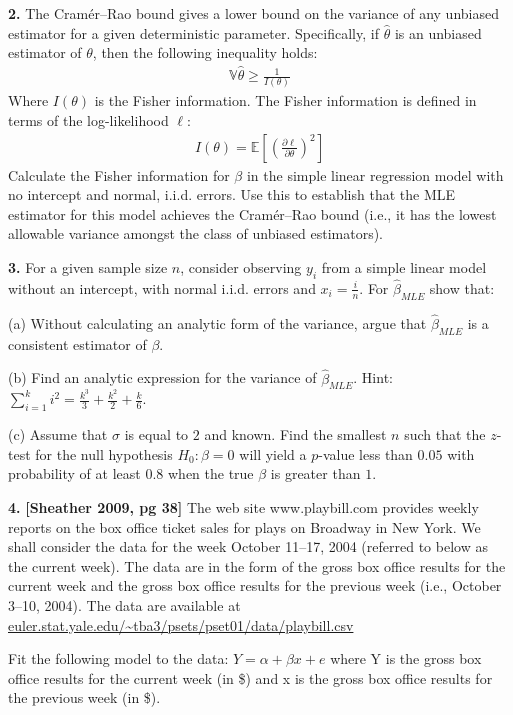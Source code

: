 \documentclass[12pt]{article}
\begin{document}
\bigskip

{\bf 2.} The Cramér–Rao bound gives a lower bound on the variance of any unbiased estimator
for a given deterministic parameter. Specifically, if $\widehat{\theta}$ is an unbiased
estimator of $\theta$, then the following inequality holds:
\begin{align}
\mathbb{V} \widehat{\theta} \geq \frac{1}{I(\theta)}
\end{align}
Where $I(\theta)$ is the Fisher information. The Fisher information is defined in terms
of the log-likelihood $\ell$:
\begin{align}
I(\theta) = \mathbb{E} \left[ \left( \frac{\partial \ell}{\partial \theta} \right)^2 \right]
\end{align}
Calculate the Fisher information for $\beta$ in the simple linear regression model with
no intercept and normal, i.i.d. errors. Use this to establish that the MLE estimator for
this model achieves the Cramér–Rao bound (i.e., it has the lowest allowable variance
amongst the class of unbiased estimators).

{\bf 3.} For a given sample size $n$, consider observing $y_i$ from a simple linear model
without an intercept, with normal i.i.d. errors and $x_i = \frac{i}{n}$.
For $\widehat{\beta}_{MLE}$ show that:

(a) Without calculating an analytic form of the variance, argue that $\widehat{\beta}_{MLE}$
is a consistent estimator of $\beta$.

(b) Find an analytic expression for the variance of $\widehat{\beta}_{MLE}$.
Hint: $\sum_{i=1}^k i^2 = \frac{k^3}{3} + \frac{k^2}{2} + \frac{k}{6}$.

(c) Assume that $\sigma$ is equal to $2$ and known. Find the smallest $n$ such that the $z$-test
for the null hypothesis $H_0: \beta = 0$ will yield a $p$-value less than $0.05$ with probability
of at least $0.8$ when the true $\beta$ is greater than $1$.

{\bf 4.} {\bf [Sheather 2009, pg 38]} The web site www.playbill.com provides weekly reports on the box office ticket sales for plays on Broadway in New York. We shall consider the data for the week October 11–17, 2004 (referred to below as the current week). The data are in the form of the gross box office results for the current week and the gross box office results for the previous week (i.e., October 3–10, 2004). The data are available at \url{euler.stat.yale.edu/~tba3/psets/pset01/data/playbill.csv}

Fit the following model to the data: $Y = \alpha + \beta x + e$ where Y is the gross box office results for the current week (in \$) and x is the gross box office results for the previous week (in \$).
\end{document}
